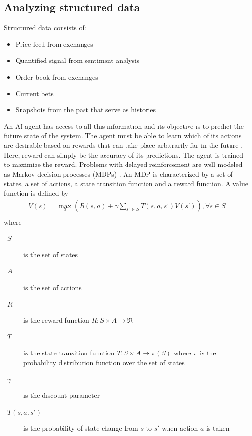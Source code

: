 \documentclass[a4paper]{article}
\begin{document}
\subsection{Analyzing structured data}
Structured data consists of:
\begin{itemize}
	\item Price feed from exchanges
	\item Quantified signal from sentiment analysis
	\item Order book from exchanges
	\item Current bets
	\item Snapshots from the past that serve as histories
\end{itemize}
An AI agent has access to all this information and its objective is to predict the future state of the system. The agent must be able to learn which of its actions are desirable based on rewards that can take place arbitrarily far in the future \cite{RLSurvey}. Here, reward can simply be the accuracy of its predictions. The agent is trained to maximize the reward. Problems with delayed reinforcement are well modeled as Markov decision processes (MDPs) \cite{MDP}. An MDP is characterized by a set of states, a set of actions, a state transition function and a reward function. A value function is defined by
\begin{gather*}
V(s)=\max_a \left(R(s,a) + \gamma\sum\nolimits_{s' \in S}T(s,a,s')V(s') \right), \forall s \in S \\
\end{gather*}
where
\begin{description}
	\item[~$S$] is the set of states
	\item[~$A$] is the set of actions
	\item[~$R$] is the reward function  $R: S \times A \rightarrow \Re $
	\item[~$T$] is the state transition function $T: S \times A \rightarrow \pi(S) $ where $\pi$ is the probability distribution function over the set of states
	\item[~$\gamma$] is the discount parameter
	\item[~$T(s,a,s')$] is the probability of state change from $s$ to $s'$ when action $a$ is taken
\end{description}
\end{document}
